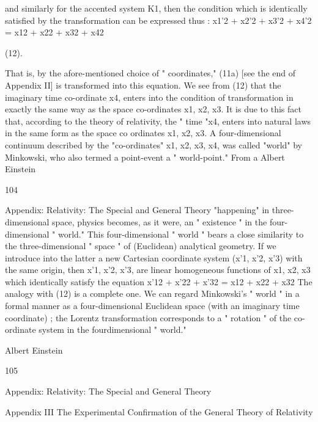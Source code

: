 \documentclass{article}
\begin{document}
and similarly for the accented system K1, then the condition which is identically satisfied by
the transformation can be expressed thus :
x1'2 + x2'2 + x3'2 + x4'2 = x12 + x22 + x32 + x42

(12).

That is, by the afore-mentioned choice of " coordinates," (11a) [see the end of Appendix
II] is transformed into this equation.
We see from (12) that the imaginary time co-ordinate x4, enters into the condition of
transformation in exactly the same way as the space co-ordinates x1, x2, x3. It is due to this
fact that, according to the theory of relativity, the " time "x4, enters into natural laws in the
same form as the space co ordinates x1, x2, x3.
A four-dimensional continuum described by the "co-ordinates" x1, x2, x3, x4, was called
"world" by Minkowski, who also termed a point-event a " world-point." From a
Albert Einstein

104

Appendix: Relativity: The Special and General Theory
"happening" in three-dimensional space, physics becomes, as it were, an " existence " in the
four-dimensional " world."
This four-dimensional " world " bears a close similarity to the three-dimensional " space
" of (Euclidean) analytical geometry. If we introduce into the latter a new Cartesian coordinate system (x'1, x'2, x'3) with the same origin, then x'1, x'2, x'3, are linear homogeneous
functions of x1, x2, x3 which identically satisfy the equation
x'12 + x'22 + x'32 = x12 + x22 + x32
The analogy with (12) is a complete one. We can regard Minkowski's " world " in a formal
manner as a four-dimensional Euclidean space (with an imaginary time coordinate) ; the
Lorentz transformation corresponds to a " rotation " of the co-ordinate system in the
fourdimensional " world."

Albert Einstein

105

Appendix: Relativity: The Special and General Theory

Appendix III
The Experimental Confirmation of the General Theory
of Relativity
\end{document}
